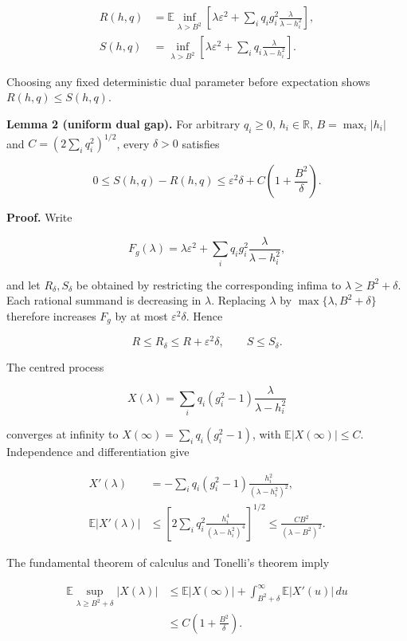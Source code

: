 \documentclass[11pt,a4paper]{article}
\begin{document}
\[
\begin{aligned}
R(h,q)&=
\mathbb E\inf_{\lambda>B^2}
\left[\lambda\varepsilon^2+
\sum_iq_i g_i^2\frac{\lambda}{\lambda-h_i^2}\right],\\
S(h,q)&=
\inf_{\lambda>B^2}
\left[\lambda\varepsilon^2+
\sum_iq_i\frac{\lambda}{\lambda-h_i^2}\right].
\end{aligned}
\tag{14}
\]

Choosing any fixed deterministic dual parameter before expectation shows
\(R(h,q)\le S(h,q)\).

\textbf{Lemma 2 (uniform dual gap).} For arbitrary \(q_i\ge0\),
\(h_i\in\mathbb R\), \(B=\max_i|h_i|\) and \(C=(2\sum_iq_i^2)^{1/2}\),
every \(\delta>0\) satisfies

\[
0\le S(h,q)-R(h,q)
\le\varepsilon^2\delta+C\left(1+\frac{B^2}{\delta}\right).
\tag{15}
\]

\textbf{Proof.} Write

\[
F_g(\lambda)=\lambda\varepsilon^2+
\sum_iq_i g_i^2\frac{\lambda}{\lambda-h_i^2},
\]

and let \(R_\delta,S_\delta\) be obtained by restricting the
corresponding infima to \(\lambda\ge B^2+\delta\). Each rational summand
is decreasing in \(\lambda\). Replacing \(\lambda\) by
\(\max\{\lambda,B^2+\delta\}\) therefore increases \(F_g\) by at most
\(\varepsilon^2\delta\). Hence

\[
R\le R_\delta\le R+\varepsilon^2\delta,\qquad S\le S_\delta.
\tag{16}
\]

The centred process

\[
X(\lambda)=\sum_iq_i(g_i^2-1)\frac{\lambda}{\lambda-h_i^2}
\]

converges at infinity to \(X(\infty)=\sum_iq_i(g_i^2-1)\), with
\(\mathbb E|X(\infty)|\le C\). Independence and differentiation give

\[
\begin{aligned}
X'(\lambda)&=-\sum_iq_i(g_i^2-1)
\frac{h_i^2}{(\lambda-h_i^2)^2},\\
\mathbb E|X'(\lambda)|
&\le
\left[2\sum_iq_i^2\frac{h_i^4}{(\lambda-h_i^2)^4}\right]^{1/2}
\le\frac{CB^2}{(\lambda-B^2)^2}.
\end{aligned}
\]

The fundamental theorem of calculus and Tonelli's theorem imply

\[
\begin{aligned}
\mathbb E\sup_{\lambda\ge B^2+\delta}|X(\lambda)|
&\le\mathbb E|X(\infty)|
+\int_{B^2+\delta}^{\infty}\mathbb E|X'(u)|\,du\\
&\le C\left(1+\frac{B^2}{\delta}\right).
\end{aligned}
\tag{17}
\]
\end{document}

